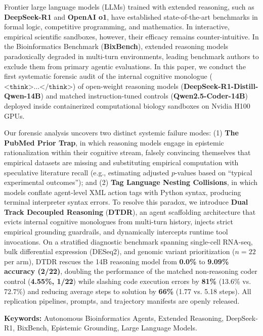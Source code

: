 \documentclass[11pt,letterpaper]{article}
\renewenvironment{abstract}
 {\small\begin{center}\textbf{\large\abstractname}\vspace{-0.6em}\vspace{0pt}\end{center}%
  \list{}{%
    \setlength{\leftmargin}{8mm}%
    \setlength{\rightmargin}{\leftmargin}%
  }%
  \setstretch{1.0}%
  \item\relax}
 {\endlist}
\begin{document}
\vspace{-0.6em}
\begin{abstract}
\noindent Frontier large language models (LLMs) trained with extended reasoning, such as \textbf{DeepSeek-R1} and \textbf{OpenAI o1}, have established state-of-the-art benchmarks in formal logic, competitive programming, and mathematics. In interactive, empirical scientific sandboxes, however, their efficacy remains counter-intuitive. In the Bioinformatics Benchmark (\textbf{BixBench}), extended reasoning models paradoxically degraded in multi-turn environments, leading benchmark authors to exclude them from primary agentic evaluations. In this paper, we conduct the first systematic forensic audit of the internal cognitive monologue ($\texttt{<think>} \dots \texttt{</think>}$) of open-weight reasoning models (\textbf{DeepSeek-R1-Distill-Qwen-14B}) and matched instruction-tuned controls (\textbf{Qwen2.5-Coder-14B}) deployed inside containerized computational biology sandboxes on Nvidia H100 GPUs.

Our forensic analysis uncovers two distinct systemic failure modes: (1) \textbf{The PubMed Prior Trap}, in which reasoning models engage in epistemic rationalization within their cognitive stream, falsely convincing themselves that empirical datasets are missing and substituting empirical computation with speculative literature recall (e.g., estimating adjusted $p$-values based on ``typical experimental outcomes''); and (2) \textbf{Tag Language Nesting Collisions}, in which models conflate agent-level XML action tags with Python syntax, producing terminal interpreter syntax errors. To resolve this paradox, we introduce \textbf{Dual Track Decoupled Reasoning} (\textbf{DTDR}), an agent scaffolding architecture that evicts internal cognitive monologues from multi-turn history, injects strict empirical grounding guardrails, and dynamically intercepts runtime tool invocations. On a stratified diagnostic benchmark spanning single-cell RNA-seq, bulk differential expression (DESeq2), and genomic variant prioritization ($n=22$ per arm), DTDR rescues the 14B reasoning model from \textbf{0.0\%} to \textbf{9.09\% accuracy (2/22)}, doubling the performance of the matched non-reasoning coder control (\textbf{4.55\%, 1/22}) while slashing code execution errors by \textbf{81\%} (13.6\% vs. 72.7\%) and reducing average steps to solution by \textbf{66\%} (1.77 vs. 5.18 steps). All replication pipelines, prompts, and trajectory manifests are openly released.

\vspace{0.4em}
\noindent\textbf{Keywords:} Autonomous Bioinformatics Agents, Extended Reasoning, DeepSeek-R1, BixBench, Epistemic Grounding, Large Language Models.
\end{abstract}
\end{document}
